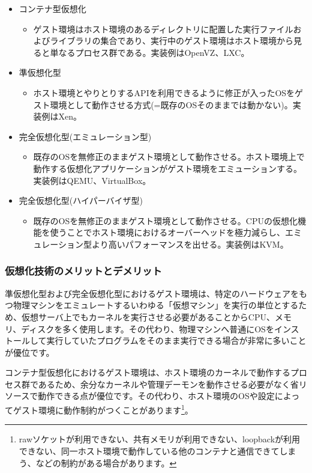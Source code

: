 \documentclass[mingoth,a4paper]{jsarticle}
\begin{document}
\begin{itemize}
  \item コンテナ型仮想化
  \begin{itemize}
  \item ゲスト環境はホスト環境のあるディレクトリに配置した実行ファイルおよびライブラリの集合であり、実行中のゲスト環境はホスト環境から見ると単なるプロセス群である。実装例はOpenVZ、LXC。
  \end{itemize}
  \item 準仮想化型
  \begin{itemize}
  \item ホスト環境とやりとりするAPIを利用できるように修正が入ったOSをゲスト環境として動作させる方式(=既存のOSそのままでは動かない)。実装例はXen。
  \end{itemize}
  \item 完全仮想化型(エミュレーション型)
  \begin{itemize}
  \item 既存のOSを無修正のままゲスト環境として動作させる。ホスト環境上で動作する仮想化アプリケーションがゲスト環境をエミューションする。実装例はQEMU、VirtualBox。
  \end{itemize}
\item 完全仮想化型(ハイパーバイザ型)
  \begin{itemize}
  \item 既存のOSを無修正のままゲスト環境として動作させる。CPUの仮想化機能を使うことでホスト環境におけるオーバーヘッドを極力減らし、エミュレーション型より高いパフォーマンスを出せる。実装例はKVM。
  \end{itemize}
\end{itemize}

\subsubsection{仮想化技術のメリットとデメリット}

準仮想化型および完全仮想化型におけるゲスト環境は、特定のハードウェアをもつ物理マシンをエミュレートするいわゆる「仮想マシン」を実行の単位とするため、仮想サーバ上でもカーネルを実行させる必要があることからCPU、メモリ、ディスクを多く使用します。その代わり、物理マシンへ普通にOSをインストールして実行していたプログラムをそのまま実行できる場合が非常に多いことが優位です。

コンテナ型仮想化におけるゲスト環境は、ホスト環境のカーネルで動作するプロセス群であるため、余分なカーネルや管理デーモンを動作させる必要がなく省リソースで動作できる点が優位です。その代わり、ホスト環境のOSや設定によってゲスト環境に動作制約がつくことがあります\footnote{rawソケットが利用できない、共有メモリが利用できない、loopbackが利用できない、同一ホスト環境で動作している他のコンテナと通信できてしまう、などの制約がある場合があります。}。
\end{document}
